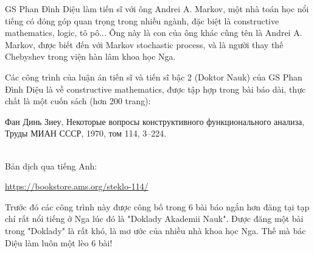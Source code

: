 \label{LTQT}
GS Phan Đình Diệu làm tiến sĩ với ông Andrei A. Markov, một nhà toán học nổi tiếng có đóng góp quan trọng trong nhiều ngành, đặc biệt là constructive mathematics, logic, tô pô... Ông này là con của ông khác cũng tên là Andrei A. Markov, được biết đến với Markov stochastic process, và là người thay thế Chebyshev trong viện hàn lâm khoa học Nga.

Các công trình của luận án tiến sĩ và tiến sĩ bậc 2 (Doktor Nauk) của GS Phan Đình Diệu là về constructive mathematics, được tập hợp trong bài báo dài, thực chất là một cuốn sách (hơn 200 trang):

{
Фан Динь Зиеу, Некоторые вопросы конструктивного функционального анализа, Труды МИАН СССР, 1970,
том 114, 3–224.}

\  \\
\noindent Bản dịch qua tiếng Anh:
\begin{center}
\url{https://bookstore.ams.org/steklo-114/}
\end{center}
Trước đó các công trình này được công bố trong 6 bài báo ngắn hơn đăng tại tạp chí rất nổi tiếng ở Nga lúc đó là "Doklady Akademii Nauk". Được đăng một bài trong "Doklady" là rất khó, là mơ ước của nhiều nhà khoa học Nga. Thế mà bác Diệu làm luôn một lèo 6 bài!